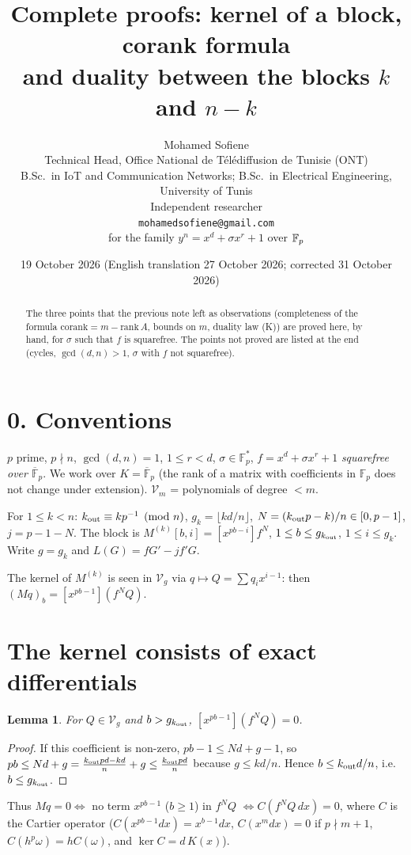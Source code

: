 \documentclass[11pt,a4paper]{article}
\title{Complete proofs: kernel of a block, corank formula\\and duality between the blocks $k$ and $n-k$}
\author{Mohamed Sofiene\\[2pt]
\small Technical Head, Office National de T\'el\'ediffusion de Tunisie (ONT)\\
\small B.Sc.\ in IoT and Communication Networks; B.Sc.\ in Electrical Engineering, University of Tunis\\
\small Independent researcher\\
\small \texttt{mohamedsofiene@gmail.com}\\[2pt]
\small for the family $y^n=x^d+\sigma x^r+1$ over $\F$}
\date{19 October 2026 (English translation 27 October 2026; corrected 31 October 2026)}
\newtheorem{lem}[thm]{Lemma}
\theoremstyle{remark}\newtheorem*{rem}{Remark}
\newcommand{\K}{\overline{\mathbb F}_p}
\newcommand{\F}{\mathbb F_p}
\newcommand{\V}{\mathcal V}
\begin{document}
\maketitle
\begin{abstract}
The three points that the previous note left as observations (completeness of the formula $\mathrm{corank}=m-\mathrm{rank}\,A$, bounds on $m$, duality law (K)) are proved here, by hand, for $\sigma$ such that $f$ is squarefree. The points not proved are listed at the end (cycles, $\gcd(d,n)>1$, $\sigma$ with $f$ not squarefree).
\end{abstract}

\section*{0. Conventions}
$p$ prime, $p\nmid n$, $\gcd(d,n)=1$, $1\le r<d$, $\sigma\in\F^*$, $f=x^d+\sigma x^r+1$ \emph{squarefree over $\K$}. We work over $K=\K$ (the rank of a matrix with coefficients in $\F$ does not change under extension). $\V_m$ = polynomials of degree $<m$.

For $1\le k<n$: $k_{\rm out}\equiv kp^{-1}\pmod n$, $g_k=\lfloor kd/n\rfloor$, $N=(k_{\rm out}p-k)/n\in[0,p-1]$, $j=p-1-N$. The block is $M^{(k)}[b,i]=[x^{pb-i}]f^N$, $1\le b\le g_{k_{\rm out}}$, $1\le i\le g_k$. Write $g=g_k$ and $L(G)=fG'-jf'G$.

The kernel of $M^{(k)}$ is seen in $\V_g$ via $q\mapsto Q=\sum q_ix^{i-1}$: then $(Mq)_b=[x^{pb-1}](f^NQ)$.

\section{The kernel consists of exact differentials}

\begin{lem}\label{l0} For $Q\in\V_g$ and $b>g_{k_{\rm out}}$, $[x^{pb-1}](f^NQ)=0$.\end{lem}
\begin{proof} If this coefficient is non-zero, $pb-1\le Nd+g-1$, so $pb\le Nd+g=\frac{k_{\rm out}pd-kd}{n}+g\le\frac{k_{\rm out}pd}{n}$ because $g\le kd/n$. Hence $b\le k_{\rm out}d/n$, i.e.\ $b\le g_{k_{\rm out}}$.\end{proof}

Thus $Mq=0\iff$ no term $x^{pb-1}$ ($b\ge1$) in $f^NQ$ $\iff C(f^NQ\,dx)=0$, where $C$ is the Cartier operator ($C(x^{pb-1}dx)=x^{b-1}dx$, $C(x^mdx)=0$ if $p\nmid m+1$, $C(h^p\omega)=hC(\omega)$, and $\ker C=d\,K(x)$).
\end{document}
